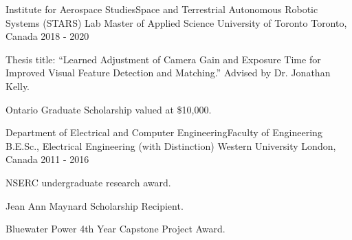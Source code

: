 

\begin{cventries}

  \cventry
    {Institute for Aerospace Studies{\enskip\cdotp\enskip}Space and Terrestrial Autonomous Robotic Systems (STARS) Lab} %
    {Master of Applied Science {\enskip\cdotp\enskip}University of Toronto} %
    {Toronto, Canada} %
    {2018 - 2020} %
    {
      \begin{cvitems} %
        \item {Thesis title: ``Learned Adjustment of Camera Gain and Exposure Time for Improved Visual Feature Detection and Matching.'' Advised by Dr. Jonathan Kelly.}
        \item {Ontario Graduate Scholarship valued at \$10,000.}
      \end{cvitems}
    }

  \cventry
    {Department of Electrical and Computer Engineering{\enskip\cdotp\enskip}Faculty of Engineering} %
    {B.E.Sc., Electrical Engineering (with Distinction) {\enskip\cdotp\enskip}Western University} %
    {London, Canada} %
    {2011 - 2016} %
    {
      \begin{cvitems} %
        \item {NSERC undergraduate research award.}
        \item {Jean Ann Maynard Scholarship Recipient.}
        \item {Bluewater Power 4th Year Capstone Project Award.}
      \end{cvitems}
    }

\end{cventries}

